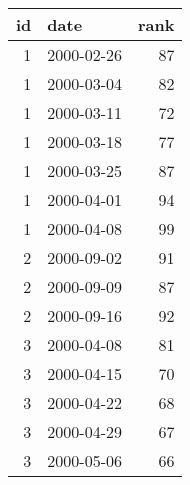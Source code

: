 \begin{tabular}{rlr}
  \toprule
 id & date & rank \\ 
  \midrule
    1 & 2000-02-26 &  87 \\ 
    1 & 2000-03-04 &  82 \\ 
    1 & 2000-03-11 &  72 \\ 
    1 & 2000-03-18 &  77 \\ 
    1 & 2000-03-25 &  87 \\ 
    1 & 2000-04-01 &  94 \\ 
    1 & 2000-04-08 &  99 \\ 
    2 & 2000-09-02 &  91 \\ 
    2 & 2000-09-09 &  87 \\ 
    2 & 2000-09-16 &  92 \\ 
    3 & 2000-04-08 &  81 \\ 
    3 & 2000-04-15 &  70 \\ 
    3 & 2000-04-22 &  68 \\ 
    3 & 2000-04-29 &  67 \\ 
    3 & 2000-05-06 &  66 \\ 
   \bottomrule
\end{tabular}
